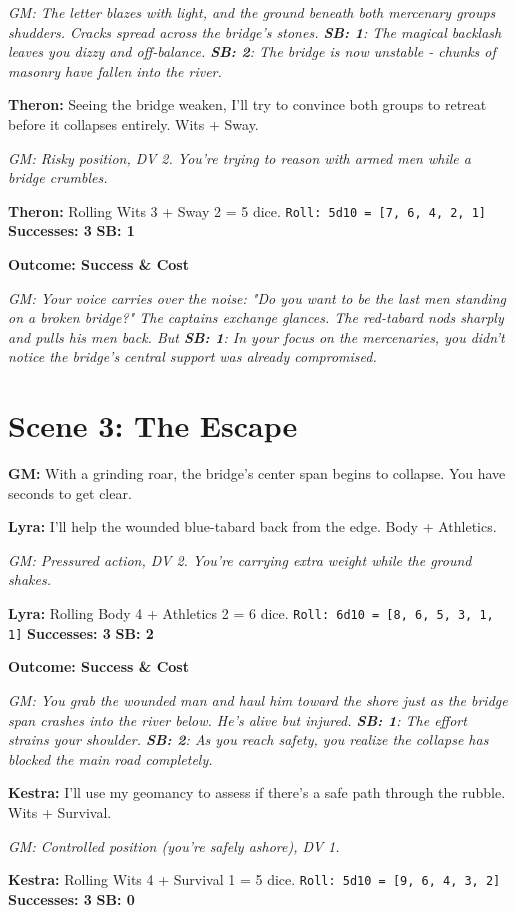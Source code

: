 \documentclass[11pt]{article}
\newcommand{\player}[1]{\textbf{#1:}}
\newcommand{\gm}[1]{\textit{GM: #1}}
\newcommand{\roll}[2]{\texttt{Roll: #1d10 = [#2]}}
\newcommand{\success}[1]{\textbf{Successes: #1}}
\newcommand{\cp}[1]{\textbf{SB: #1}}
\newcommand{\outcome}[1]{\textbf{Outcome: #1}}
\begin{document}
\gm{The letter blazes with light, and the ground beneath both mercenary groups shudders. Cracks spread across the bridge's stones. \cp{1}: The magical backlash leaves you dizzy and off-balance. \cp{2}: The bridge is now unstable - chunks of masonry have fallen into the river.}

\player{Theron} Seeing the bridge weaken, I'll try to convince both groups to retreat before it collapses entirely. Wits + Sway.

\gm{Risky position, DV 2. You're trying to reason with armed men while a bridge crumbles.}

\player{Theron} Rolling Wits 3 + Sway 2 = 5 dice. \roll{5}{7, 6, 4, 2, 1} \success{3} \cp{1}

\outcome{Success \& Cost}

\gm{Your voice carries over the noise: "Do you want to be the last men standing on a broken bridge?" The captains exchange glances. The red-tabard nods sharply and pulls his men back. But \cp{1}: In your focus on the mercenaries, you didn't notice the bridge's central support was already compromised.}

\section*{Scene 3: The Escape}

\player{GM} With a grinding roar, the bridge's center span begins to collapse. You have seconds to get clear.

\player{Lyra} I'll help the wounded blue-tabard back from the edge. Body + Athletics.

\gm{Pressured action, DV 2. You're carrying extra weight while the ground shakes.}

\player{Lyra} Rolling Body 4 + Athletics 2 = 6 dice. \roll{6}{8, 6, 5, 3, 1, 1} \success{3} \cp{2}

\outcome{Success \& Cost}

\gm{You grab the wounded man and haul him toward the shore just as the bridge span crashes into the river below. He's alive but injured. \cp{1}: The effort strains your shoulder. \cp{2}: As you reach safety, you realize the collapse has blocked the main road completely.}

\player{Kestra} I'll use my geomancy to assess if there's a safe path through the rubble. Wits + Survival.

\gm{Controlled position (you're safely ashore), DV 1.}

\player{Kestra} Rolling Wits 4 + Survival 1 = 5 dice. \roll{5}{9, 6, 4, 3, 2} \success{3} \cp{0}
\end{document}

